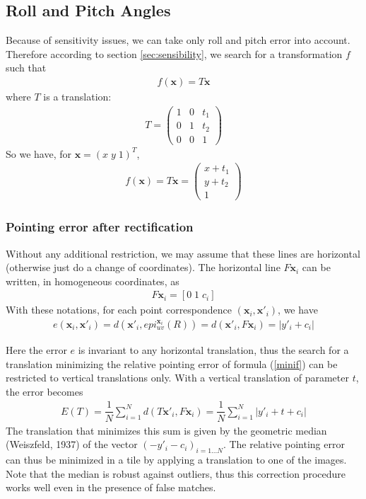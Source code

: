 \documentclass[paper=a4, fontsize=11pt]{article}
\begin{document}
\subsection{Roll and Pitch Angles}
Because of sensitivity issues, we can take only roll and pitch error into account. Therefore according to section \ref{sec:sensibility}, we search for a transformation $f$ such that
\begin{align*}
f(\textbf{x}) = T\textbf{x}
\end{align*}
where $T$ is a translation:
\begin{align*}
T = 
\begin{pmatrix} 
1 & 0 & t_1 \\
0 & 1 & t_2 \\
0 & 0 & 1
\end{pmatrix}
\end{align*}
So we have, for $ \textbf{x} = (  x \; y \; 1)^T $, 
\begin{align*}
f(\textbf{x}) = T\textbf{x} = 
\begin{pmatrix} 
x + t_1 \\
y + t_2 \\
1
\end{pmatrix}
\end{align*}

\subsubsection{Pointing error after rectification}
Without any additional restriction, we may assume that these lines are horizontal (otherwise just do a change of coordinates). The horizontal line $F\textbf{x}_i$ can be written, in homogeneous coordinates, as
\begin{align*}
F\textbf{x}_i = \left[ 0 \; 1 \; c_i \right]
\end{align*}
With these notations, for each point correspondence $(\textbf{x}_i , \textbf{x}'_i)$, we have
\begin{align*}
e(\textbf{x}_i, \textbf{x}'_i) = d(\textbf{x}'_i, epi^{\textbf{x}_i}_{u v}(R)) = d(\textbf{x}'_i, F\textbf{x}_i) = | y'_i + c_i|
\end{align*}

Here the error $e$ is invariant to any horizontal translation, thus the search for a translation minimizing the relative pointing error of formula (\ref{minif}) can be restricted to vertical translations only. With a vertical translation of parameter $t$, the error becomes
\begin{align*}
E(T) = \dfrac{1}{N} \sum\limits_{i=1}^{N} d(T\textbf{x}'_i, F\textbf{x}_i) = \dfrac{1}{N} \sum\limits_{i=1}^{N} | y'_i + t+ c_i|
\end{align*}
The translation that minimizes this sum is given by the geometric median (Weiszfeld, 1937) of the vector $(-y'_i - c_i )_{i=1...N}$.  The relative pointing error can thus be minimized in a tile by applying a translation to one of the images. Note that the median is robust against outliers, thus this correction procedure works well even in the presence of false matches.
\end{document}
